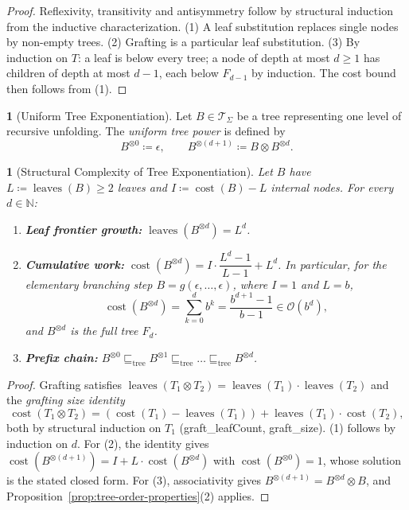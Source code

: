 \documentclass[oneside,english]{amsart}
\numberwithin{equation}{section}
\numberwithin{figure}{section}
\theoremstyle{plain}
\theoremstyle{definition}
\newtheorem{defn}[thm]{\protect\definitionname}
\theoremstyle{plain}
\newtheorem{prop}[thm]{\protect\propositionname}
\theoremstyle{remark}
\theoremstyle{plain}
\theoremstyle{definition}
\theoremstyle{plain}
\theoremstyle{remark}
\DeclareMathOperator{\cost}{cost}
\DeclareMathOperator{\leaves}{leaves}
\newcommand{\lean}[1]{{\ttfamily\small #1}}
\providecommand{\definitionname}{Definition}
\providecommand{\propositionname}{Proposition}
\begin{document}
\begin{proof}
Reflexivity, transitivity and antisymmetry follow by structural induction from the inductive characterization. (1) A leaf substitution replaces single nodes by non-empty trees. (2) Grafting is a particular leaf substitution. (3) By induction on $T$: a leaf is below every tree; a node of depth at most $d \ge 1$ has children of depth at most $d-1$, each below $F_{d-1}$ by induction. The cost bound then follows from (1).
\end{proof}

\begin{defn}[Uniform Tree Exponentiation]\label{def:tree-exponentiation}
Let $B \in \mathcal{T}_\Sigma$ be a tree representing one level of recursive unfolding. The \textit{uniform tree power} is defined by
\[
B^{\otimes 0} \coloneqq \epsilon, \qquad B^{\otimes (d+1)} \coloneqq B \otimes B^{\otimes d}.
\]
\end{defn}

\begin{prop}[Structural Complexity of Tree Exponentiation]\label{prop:tree-power-complexity}
Let $B$ have $L \coloneqq \leaves(B) \ge 2$ leaves and $I \coloneqq \cost(B) - L$ internal nodes. For every $d \in \mathbb{N}$:
\begin{enumerate}
    \item \textbf{Leaf frontier growth:} $\leaves\left(B^{\otimes d}\right) = L^d$.
    \item \textbf{Cumulative work:} $\cost\left(B^{\otimes d}\right) = I \cdot \dfrac{L^d - 1}{L - 1} + L^d$. In particular, for the elementary branching step $B = g(\epsilon, \dots, \epsilon)$, where $I = 1$ and $L = b$,
    \[
    \cost\left(B^{\otimes d}\right) = \sum_{k=0}^{d} b^k = \frac{b^{d+1} - 1}{b - 1} \in \mathcal{O}(b^d),
    \]
    and $B^{\otimes d}$ is the full tree $F_d$.
    \item \textbf{Prefix chain:} $B^{\otimes 0} \sqsubseteq_{\text{tree}} B^{\otimes 1} \sqsubseteq_{\text{tree}} \dots \sqsubseteq_{\text{tree}} B^{\otimes d}$.
\end{enumerate}
\end{prop}
\begin{proof}
Grafting satisfies $\leaves(T_1 \otimes T_2) = \leaves(T_1) \cdot \leaves(T_2)$ and the \emph{grafting size identity}
\[
\cost(T_1 \otimes T_2) = \left(\cost(T_1) - \leaves(T_1)\right) + \leaves(T_1) \cdot \cost(T_2),
\]
both by structural induction on $T_1$ (\lean{graft\_\allowbreak leafCount}, \lean{graft\_\allowbreak size}). (1) follows by induction on $d$. For (2), the identity gives $\cost(B^{\otimes (d+1)}) = I + L \cdot \cost(B^{\otimes d})$ with $\cost(B^{\otimes 0}) = 1$, whose solution is the stated closed form. For (3), associativity gives $B^{\otimes (d+1)} = B^{\otimes d} \otimes B$, and Proposition~\ref{prop:tree-order-properties}(2) applies.
\end{proof}
\end{document}
